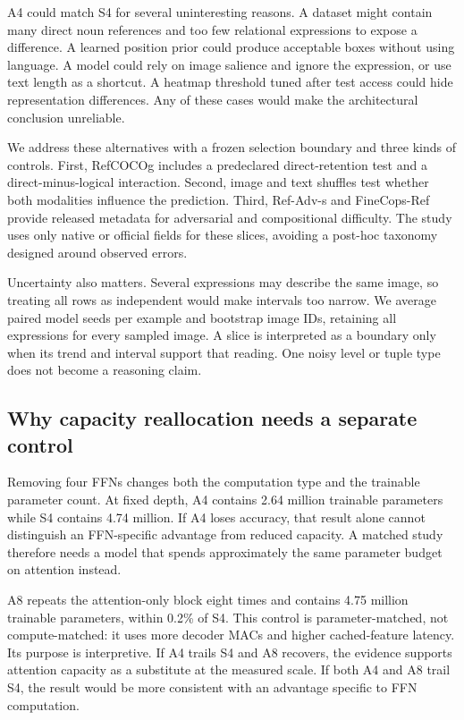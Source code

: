 \documentclass[10pt]{article}
\begin{document}
A4 could match S4 for several uninteresting reasons. A dataset might contain
many direct noun references and too few relational expressions to expose a
difference. A learned position prior could produce acceptable boxes without
using language. A model could rely on image salience and ignore the expression,
or use text length as a shortcut. A heatmap threshold tuned after test access
could hide representation differences. Any of these cases would make the
architectural conclusion unreliable.

We address these alternatives with a frozen selection boundary and three kinds
of controls. First, RefCOCOg includes a predeclared direct-retention test and a
direct-minus-logical interaction. Second, image and text shuffles test whether
both modalities influence the prediction. Third, Ref-Adv-s and FineCops-Ref
provide released metadata for adversarial and compositional difficulty. The
study uses only native or official fields for these slices, avoiding a
post-hoc taxonomy designed around observed errors.

Uncertainty also matters. Several expressions may describe the same image, so
treating all rows as independent would make intervals too narrow. We average
paired model seeds per example and bootstrap image IDs, retaining all
expressions for every sampled image. A slice is interpreted as a boundary only
when its trend and interval support that reading. One noisy level or tuple type
does not become a reasoning claim.

\subsection{Why capacity reallocation needs a separate control}\label{why-capacity-reallocation-needs-a-separate-control}

Removing four FFNs changes both the computation type and the trainable
parameter count. At fixed depth, A4 contains 2.64 million trainable parameters
while S4 contains 4.74 million. If A4 loses accuracy, that result alone cannot
distinguish an FFN-specific advantage from reduced capacity. A matched study
therefore needs a model that spends approximately the same parameter budget on
attention instead.

A8 repeats the attention-only block eight times and contains 4.75 million
trainable parameters, within 0.2\% of S4. This control is parameter-matched,
not compute-matched: it uses more decoder MACs and higher cached-feature
latency. Its purpose is interpretive. If A4 trails S4 and A8 recovers, the
evidence supports attention capacity as a substitute at the measured scale. If
both A4 and A8 trail S4, the result would be more consistent with an advantage
specific to FFN computation.
\end{document}
